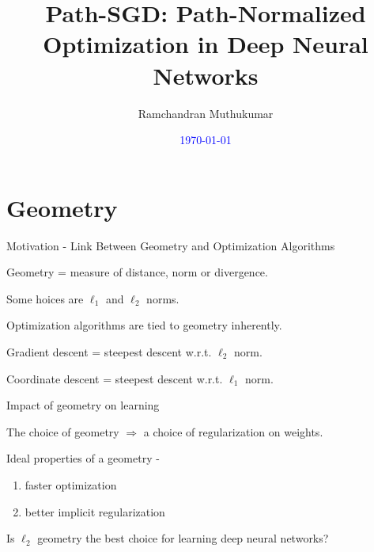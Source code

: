 \documentclass[presentation,xcolor={usenames,dvipsnames},10pt]{beamer}
\title{Path-SGD: Path-Normalized Optimization in Deep Neural Networks}
\date{\textcolor{blue}{\today}}
\author{Ramchandran Muthukumar}
\begin{document}
\begin{frame}
\titlepage
\end{frame}

\section{Geometry}

\begin{frame}{Motivation - Link Between Geometry and Optimization Algorithms}
\bit 
\item Geometry = measure of distance, norm or divergence. 

\item Some hoices are $\ell_1$ and $\ell_2$ norms. 

\item Optimization algorithms are tied to geometry inherently. 

\item Gradient descent = steepest descent w.r.t. $\ell_2$ norm. 

\item Coordinate descent = steepest descent w.r.t.  $\ell_1$ norm. 

\eit 
\end{frame}

\begin{frame}{Impact of geometry on learning}
\bit 

\item The choice of geometry $\Rightarrow$ a choice of regularization on weights. 

\item Ideal properties of a geometry -
\begin{enumerate}
	\item faster optimization
	\item better implicit regularization 
\end{enumerate}
\item Is $\ell_2$ geometry the best choice for learning deep neural networks?
\eit 
\end{frame}
\end{document}
